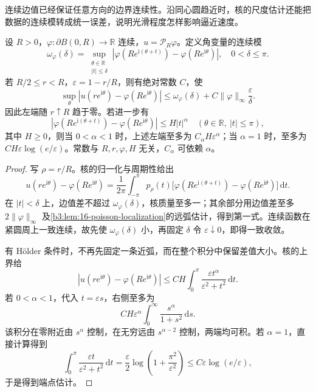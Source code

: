 连续边值已经保证任意方向的边界连续性。沿同心圆趋近时，核的尺度估计还能把数据的连续模转成统一误差，说明光滑程度怎样影响逼近速度。

\begin{proposition}[径向边界误差]\label{b3:prop:16-poisson-boundary-rate}
设 \(R>0\)，\(\varphi:\partial B(0,R)\to\mathbb R\) 连续，\(u=\mathcal P_R\varphi\)。定义角变量的连续模
\[
 \omega_\varphi(\delta)=
 \sup_{\substack{\theta\in\mathbb R\\|t|\le\delta}}
 |\varphi(Re^{\mathrm i(\theta+t)})
       -\varphi(Re^{\mathrm i\theta})|,
 \quad 0<\delta\le\pi.
\]
若 \(R/2\le r<R\)，\(\varepsilon=1-r/R\)，则有绝对常数 \(C\)，使
\[
 \sup_\theta|u(re^{\mathrm i\theta})-\varphi(Re^{\mathrm i\theta})|
 \le\omega_\varphi(\delta)
       +C\|\varphi\|_\infty\frac{\varepsilon}{\delta}.
\]
因此左端随 \(r\uparrow R\) 趋于零。若进一步有
\[
 |\varphi(Re^{\mathrm i(\theta+t)})
       -\varphi(Re^{\mathrm i\theta})|
 \le H|t|^\alpha
 \quad(\theta\in\mathbb R,\ |t|\le\pi),
\]
其中 \(H\ge0\)，则当 \(0<\alpha<1\) 时，上述左端至多为
\(C_\alpha H\varepsilon^\alpha\)；当 \(\alpha=1\) 时，至多为
\(CH\varepsilon\log(e/\varepsilon)\)。常数与 \(R,r,\varphi,H\) 无关，\(C_\alpha\) 可依赖 \(\alpha\)。
\end{proposition}
\begin{proof}
写 \(\rho=r/R\)。核的归一化与周期性给出
\[
 u(re^{\mathrm i\theta})-\varphi(Re^{\mathrm i\theta})
 =\frac1{2\pi}\int_{-\pi}^{\pi}p_\rho(t)
 \bigl[\varphi(Re^{\mathrm i(\theta+t)})
       -\varphi(Re^{\mathrm i\theta})\bigr]\,\mathrm dt.
\]
在 \(|t|<\delta\) 上，边值差不超过 \(\omega_\varphi(\delta)\)，核质量至多一；其余部分用边值差至多 \(2\|\varphi\|_\infty\) 及\cref{b3:lem:16-poisson-localization}的远弧估计，得到第一式。连续函数在紧圆周上一致连续，故先使 \(\omega_\varphi(\delta)\) 小，再固定 \(\delta\) 令 \(\varepsilon\downarrow0\)，即得一致收敛。

有 Hölder 条件时，不再先固定一条近弧，而在整个积分中保留差值大小。核的上界给
\[
 |u(re^{\mathrm i\theta})-\varphi(Re^{\mathrm i\theta})|
 \le CH\int_0^\pi
        \frac{\varepsilon t^\alpha}{\varepsilon^2+t^2}\,\mathrm dt.
\]
若 \(0<\alpha<1\)，代入 \(t=\varepsilon s\)，右侧至多为
\[
 CH\varepsilon^\alpha
       \int_0^\infty\frac{s^\alpha}{1+s^2}\,\mathrm ds.
\]
该积分在零附近由 \(s^\alpha\) 控制，在无穷远由 \(s^{\alpha-2}\) 控制，两端均可积。若 \(\alpha=1\)，直接计算得到
\[
 \int_0^\pi\frac{\varepsilon t}{\varepsilon^2+t^2}\,\mathrm dt
 =\frac{\varepsilon}{2}
     \log\left(1+\frac{\pi^2}{\varepsilon^2}\right)
 \le C\varepsilon\log(e/\varepsilon),
\]
于是得到端点估计。
\end{proof}

